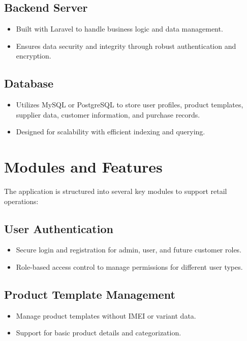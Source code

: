 \documentclass[a4paper,12pt]{article}
\begin{document}
\subsection{Backend Server}
\begin{itemize}
    \item Built with Laravel to handle business logic and data management.
    \item Ensures data security and integrity through robust authentication and encryption.
\end{itemize}

\subsection{Database}
\begin{itemize}
    \item Utilizes MySQL or PostgreSQL to store user profiles, product templates, supplier data, customer information, and purchase records.
    \item Designed for scalability with efficient indexing and querying.
\end{itemize}

\section{Modules and Features}
The application is structured into several key modules to support retail operations:

\subsection{User Authentication}
\begin{itemize}
    \item Secure login and registration for admin, user, and future customer roles.
    \item Role-based access control to manage permissions for different user types.
\end{itemize}

\subsection{Product Template Management}
\begin{itemize}
    \item Manage product templates without IMEI or variant data.
    \item Support for basic product details and categorization.
\end{itemize}
\end{document}
